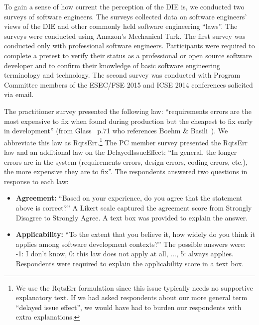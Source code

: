\documentclass[smallcondensed]{svjour3}
\newcommand{\bi}{\begin{itemize}}%
\newcommand{\ei}{\end{itemize}}
\begin{document}
To gain a sense of how current the perception of the DIE is, 
we conducted two surveys of software engineers. 
The surveys collected data on software engineers' views of the DIE and other commonly held software engineering ``laws''. The surveys were conducted using Amazon's Mechanical Turk. The first survey was conducted only with professional software engineers. Participants were required to complete a pretest to verify their status as a professional or open source software developer and to confirm their knowledge of basic software engineering terminology and technology. The  second survey was conducted with Program Committee members of the ESEC/FSE 2015 and ICSE 2014 conferences solicited via email.

The practitioner survey presented the following law: ``requirements errors are the most expensive to fix when found during production but the cheapest to fix early in development'' (from Glass~\cite{glass02} p.71 who references Boehm \& Basili~\cite{boehm01}). We abbreviate this law as RqtsErr.\footnote{We use the RqtsErr formulation since this issue typically needs no supportive explanatory
text. If we had asked respondents about our more general term ``delayed issue
effect'', we would have had to burden our respondents with extra explanations.}
The PC member survey presented the RqtsErr law and an additional law on the DelayedIssueEffect: ``In general, the longer errors are in the system (requirements errors, design errors, coding errors, etc.), the more expensive they are to fix''.  The respondents answered two questions in response to each law:
\bi
\item \textbf{Agreement:} ``Based on your experience, do you agree that the statement above is correct?'' A Likert scale captured the agreement score from Strongly Disagree to Strongly Agree. A text box was provided to explain the answer. 
\item \textbf{Applicability:} ``To the extent that you believe it, how widely do you think it applies among software development contexts?'' The possible answers were: -1: I don't know, 0: this law does not apply at all, ..., 5: always applies. Respondents were required to explain the applicability score in a text box.
\ei
\end{document}

